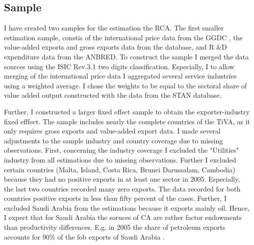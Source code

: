 \subsection{Sample}
I have created two samples for the estimation the RCA.
The first smaller estimation sample, constis of the international price data from the GGDC \parencite{Inklaar2012}, the value-added exports and gross exports data from the \cite{tiva2}  database, and R \&D expenditure data from the \textcite{stan2} ANBRED.
To construct the sample I merged the data sources using the ISIC Rev.3.1 two digits classification.
Especially, I to allow merging of the international price data I aggregated several service industries using a weighted average. I chose the weights to be equal to the sectoral share of value added output constructed with the data from the \textcite{OECDSTAN} STAN database. \par
Further, I constructed a larger fixed effect sample to obtain the exporter-industry fixed efffect.
The sample includes nearly the complete countries of the TiVA, as it only requires gross exports and value-added export data.
I made several adjustments to the sample industry and country coverage due to missing observations. First, concerning the industry coverage I excluded the "Utilities" industry from all estimations due to missing observations.
Further I excluded certain countries (Malta, Island, Costa Rica, Brunei Darussalam, Cambodia) because they had no positive exports in at least one sector in 2005.
Especially, the last two countries recorded many zero exports. The data recorded for both countries positive exports in less than fifty percent of the cases.
Further, I excluded Saudi Arabia from the estimations because it exports mainly oil. Hence, I expect that for Saudi Arabia the soruces of CA are rather factor endowments than productivity differences.
E.g. in 2005 the share of petroleum exports accounts for  90\% of the fob exports of Saudi Arabia \parencite{opec}.
\endinput
